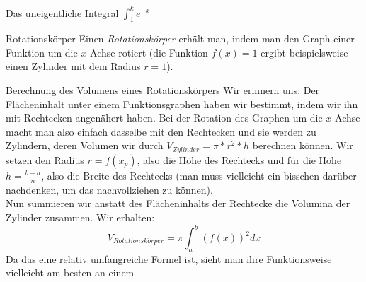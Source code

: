 \begin{marginfigure}[-15em]
  \caption{Das uneigentliche Integral $\int_1^k e^{-x}$}
\end{marginfigure}



\begin{bla}{Rotationskörper}
  Einen \emph{Rotationskörper} erhält man, indem man den Graph einer Funktion um die $x$-Achse rotiert (die Funktion $f(x)=1$ ergibt beispielsweise einen Zylinder mit dem Radius $r=1$).
\end{bla}

\begin{bla}{Berechnung des Volumens eines Rotationskörpers}
  Wir erinnern uns: Der Flächeninhalt unter einem Funktionsgraphen haben wir bestimmt, indem wir ihn mit Rechtecken angenähert haben. Bei der Rotation des Graphen um die $x$-Achse macht man also einfach dasselbe mit den Rechtecken und sie werden zu Zylindern, deren Volumen wir durch $V_{Zylinder}=\pi*r^2*h$ berechnen können. Wir setzen den Radius $r=f(x_p)$, also die Höhe des Rechtecks und für die Höhe $h=\frac{b-a}{n}$, also die Breite des Rechtecks (man muss vielleicht ein bisschen darüber nachdenken, um das nachvollziehen zu können). \\
  Nun summieren wir anstatt des Flächeninhalts der Rechtecke die Volumina der Zylinder zusammen. Wir erhalten:
  \begin{equation*}
     V_{Rotationsk\ddot orper}=\pi \int_a^b {(f(x))}^2dx
  \end{equation*}
  Da das eine relativ umfangreiche Formel ist, sieht man ihre Funktionsweise vielleicht am besten an einem
\end{bla}

